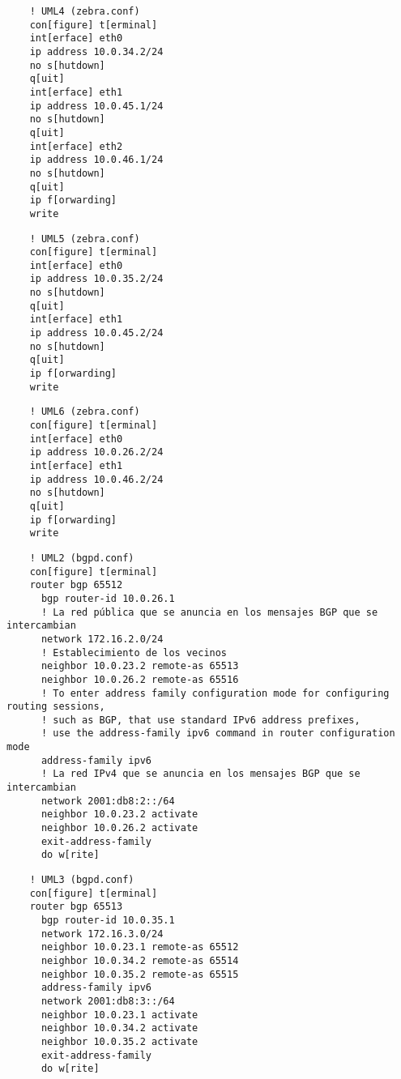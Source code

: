   \begin{verbatim}
    ! UML4 (zebra.conf)
    con[figure] t[erminal]
    int[erface] eth0
    ip address 10.0.34.2/24
    no s[hutdown]
    q[uit]
    int[erface] eth1
    ip address 10.0.45.1/24
    no s[hutdown]
    q[uit]
    int[erface] eth2
    ip address 10.0.46.1/24
    no s[hutdown]
    q[uit]
    ip f[orwarding]
    write
  \end{verbatim}

  \begin{verbatim}
    ! UML5 (zebra.conf)
    con[figure] t[erminal]
    int[erface] eth0
    ip address 10.0.35.2/24
    no s[hutdown]
    q[uit]
    int[erface] eth1
    ip address 10.0.45.2/24
    no s[hutdown]
    q[uit]
    ip f[orwarding]
    write
  \end{verbatim}

  \begin{verbatim}
    ! UML6 (zebra.conf)
    con[figure] t[erminal]
    int[erface] eth0
    ip address 10.0.26.2/24
    int[erface] eth1
    ip address 10.0.46.2/24
    no s[hutdown]
    q[uit]
    ip f[orwarding]
    write
  \end{verbatim}

  \begin{verbatim}
    ! UML2 (bgpd.conf)
    con[figure] t[erminal]
    router bgp 65512
      bgp router-id 10.0.26.1
      ! La red pública que se anuncia en los mensajes BGP que se intercambian
      network 172.16.2.0/24
      ! Establecimiento de los vecinos
      neighbor 10.0.23.2 remote-as 65513
      neighbor 10.0.26.2 remote-as 65516
      ! To enter address family configuration mode for configuring routing sessions,
      ! such as BGP, that use standard IPv6 address prefixes,
      ! use the address-family ipv6 command in router configuration mode
      address-family ipv6
      ! La red IPv4 que se anuncia en los mensajes BGP que se intercambian
      network 2001:db8:2::/64
      neighbor 10.0.23.2 activate
      neighbor 10.0.26.2 activate
      exit-address-family
      do w[rite]
  \end{verbatim}

  \begin{verbatim}
    ! UML3 (bgpd.conf)
    con[figure] t[erminal]
    router bgp 65513
      bgp router-id 10.0.35.1
      network 172.16.3.0/24
      neighbor 10.0.23.1 remote-as 65512
      neighbor 10.0.34.2 remote-as 65514
      neighbor 10.0.35.2 remote-as 65515
      address-family ipv6
      network 2001:db8:3::/64
      neighbor 10.0.23.1 activate
      neighbor 10.0.34.2 activate
      neighbor 10.0.35.2 activate
      exit-address-family
      do w[rite]
  \end{verbatim}


